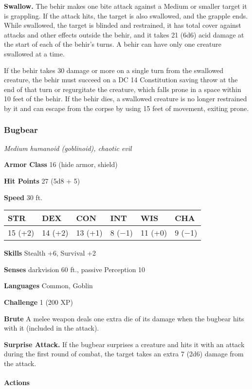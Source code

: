 \documentclass[
]{article}
\begin{document}
\textbf{Swallow.} The behir makes one bite attack against a Medium or
smaller target it is grappling. If the attack hits, the target is also
swallowed, and the grapple ends. While swallowed, the target is blinded
and restrained, it has total cover against attacks and other effects
outside the behir, and it takes 21 (6d6) acid damage at the start of
each of the behir's turns. A behir can have only one creature swallowed
at a time.

If the behir takes 30 damage or more on a single turn from the swallowed
creature, the behir must succeed on a DC 14 Constitution saving throw at
the end of that turn or regurgitate the creature, which falls prone in a
space within 10 feet of the behir. If the behir dies, a swallowed
creature is no longer restrained by it and can escape from the corpse by
using 15 feet of movement, exiting prone.

\hypertarget{bugbear}{%
\subsubsection{Bugbear}\label{bugbear}}

\emph{Medium humanoid (goblinoid), chaotic evil}

\textbf{Armor Class} 16 (hide armor, shield)

\textbf{Hit Points} 27 (5d8 + 5)

\textbf{Speed} 30 ft.

\begin{longtable}[]{@{}llllll@{}}
\toprule
STR & DEX & CON & INT & WIS & CHA\tabularnewline
\midrule
\endhead
15 (+2) & 14 (+2) & 13 (+1) & 8 (−1) & 11 (+0) & 9 (−1)\tabularnewline
\bottomrule
\end{longtable}

\textbf{Skills} Stealth +6, Survival +2

\textbf{Senses} darkvision 60 ft., passive Perception 10

\textbf{Languages} Common, Goblin

\textbf{Challenge} 1 (200 XP)

\textbf{Brute} A melee weapon deals one extra die of its damage when the
bugbear hits with it (included in the attack).

\textbf{Surprise Attack.} If the bugbear surprises a creature and hits
it with an attack during the first round of combat, the target takes an
extra 7 (2d6) damage from the attack.

\hypertarget{actions-2}{%
\paragraph{Actions}\label{actions-2}}
\end{document}
